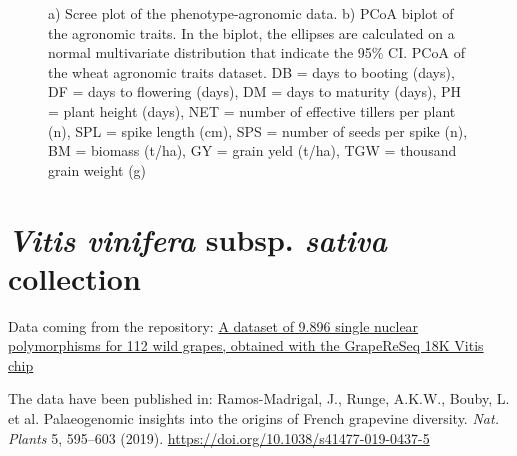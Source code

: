 \documentclass[a4paper,onecolumn,10pt]{article}
\begin{document}
\begin{figure}[H]
    \centering
    \caption{
        a) Scree plot of the phenotype-agronomic data.
        b) PCoA biplot of the agronomic traits.
        In the biplot, the ellipses are calculated on a normal multivariate distribution that indicate the 95\% CI.
        PCoA of the wheat agronomic traits dataset.
        DB = days to booting (days),
        DF = days to flowering (days),
        DM = days to maturity (days),
        PH = plant height (days),
        NET = number of effective tillers per plant (n),
        SPL = spike length (cm),
        SPS = number of seeds per spike (n),
        BM = biomass (t/ha),
        GY = grain yeld (t/ha),
        TGW = thousand grain weight (g)}
    \label{fig:scree_PCA_location}
\end{figure}

\newpage
\section{\textit{Vitis vinifera} subsp. \textit{sativa} collection}

Data coming from the repository: \href{https://entrepot.recherche.data.gouv.fr/dataset.xhtml;jsessionid=2f4de81d5749162093ac55d6a7b0?persistentId=doi:10.15454/9RUCEP&version=&q=&fileAccess=&fileTag=&fileSortField=date&fileSortOrder=}{A dataset of 9.896 single nuclear polymorphisms for 112 wild grapes, obtained with the GrapeReSeq 18K Vitis chip}

The data have been published in: Ramos-Madrigal, J., Runge, A.K.W., Bouby, L. et al. Palaeogenomic insights into the origins of French grapevine diversity. \textit{Nat. Plants} 5, 595–603 (2019). \href{https://doi.org/10.1038/s41477-019-0437-5}{https://doi.org/10.1038/s41477-019-0437-5}

\end{document}
